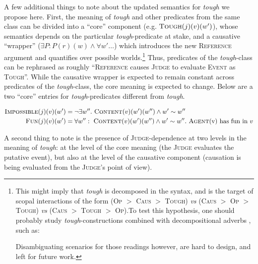 \documentclass[11pt]{article}
\begin{document}
A few additional things to note about the updated semantics for \textit{tough} we propose here. First, the meaning of \textit{tough} and other predicates from the same class can be divided into a ``core'' component (e.g. $\textsc{Tough}(j)(v)(w')$), whose semantics depends on the particular \textit{tough}-predicate at stake, and a causative ``wrapper'' ($\exists P: P(r)(w) \wedge \forall w' \dots$) which introduces the new \textsc{Reference} argument and quantifies over possible worlds.\footnote{This might imply that \textit{tough} is decomposed in the syntax, and is the target of scopal interactions of the form (\textsc{Op} $>$ \textsc{Caus} $>$ \textsc{Tough}) \textit{vs} (\textsc{Caus} $>$ \textsc{Op} $>$\textsc{Tough}) \textit{vs} (\textsc{Caus} $>$ \textsc{Tough} $>$ \textsc{Op}).To test this hypothesis, one should probably study \textit{tough}-constructions combined with decompositional adverbs \cite{McCawley1971,Rapp1999}, such as:
	\begin{exe}
	\end{exe}
	Disambiguating scenarios for those readings however, are hard to design, and left for future work.} Thus, predicates of the \textit{tough}-class can be rephrased as roughly  ``\textsc{Reference} causes \textsc{Judge} to evaluate \textsc{Event} as \textsc{Tough}''. While the causative wrapper is expected to remain constant across predicates of the \textit{tough}-class, the core meaning is expected to change. Below are a two ``core'' entries for \textit{tough}-predicates different from \textit{tough}.

\begin{align*}
	\textsc{Impossible}(j)(v)(w') &= \neg \exists w''. \ \textsc{Content}(v)(w')(w'') \wedge w' \sim w''\\
	\textsc{Fun}(j)(v)(w') &= \forall w'': \ \textsc{Content}(v)(w')(w'') \wedge w' \sim w''. \ \text{\textsc{Agent}(v) has fun in $v$}
\end{align*}


A second thing to note is the presence of \textsc{Judge}-dependence at two levels in the meaning of \textit{tough}: at the level of the core meaning (the \textsc{Judge} evaluates the putative event), but also at the level of the causative component (causation is being evaluated from the \textsc{Judge}'s point of view).\\
\end{document}
